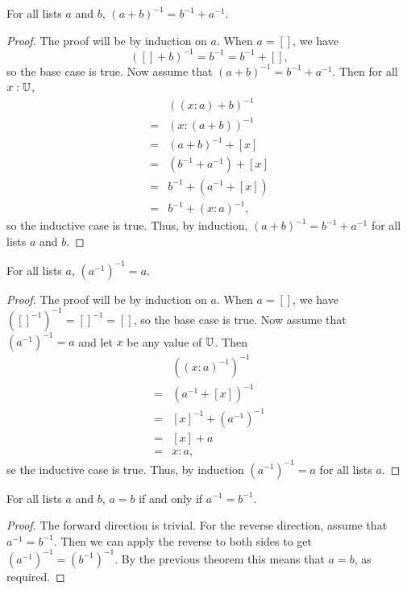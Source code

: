 \documentclass[../../math.tex]{subfiles}
\begin{document}
\begin{theorem}
    For all lists $a$ and $b$, $(a + b)^{-1} = b^{-1} + a^{-1}$.
\end{theorem}
\begin{proof}
    The proof will be by induction on $a$.  When $a = []$, we have
    \[
        ([] + b)^{-1} = b^{-1} = b^{-1} + [],
    \]
    so the base case is true.  Now assume that $(a + b)^{-1} = b^{-1} +
    a^{-1}$.  Then for all $x : \mathbb{U}$,
    \begin{align*}
           & ((x : a) + b)^{-1} \\
        ={}& (x : (a + b))^{-1} \\
        ={}& (a + b)^{-1} + [x] \\
        ={}& (b^{-1} + a^{-1}) + [x] \\
        ={}& b^{-1} + (a^{-1} + [x]) \\
        ={}& b^{-1} + (x : a)^{-1},
    \end{align*}
    so the inductive case is true.  Thus, by induction, $(a + b)^{-1} =
    b^{-1} + a^{-1}$ for all lists $a$ and $b$.
\end{proof}

\begin{theorem} \label{list_reverse_reverse}
    For all lists $a$, $(a^{-1})^{-1} = a$.
\end{theorem}
\begin{proof}
    The proof will be by induction on $a$.  When $a = []$, we have
    $([]^{-1})^{-1} = []^{-1} = []$, so the base case is true.  Now assume that
    $(a^{-1})^{-1} = a$ and let $x$ be any value of $\mathbb{U}$.  Then
    \begin{align*}
           & ((x : a)^{-1})^{-1} \\
        ={}& (a^{-1} + [x])^{-1} \\
        ={}& [x]^{-1} + (a^{-1})^{-1} \\
        ={}& [x] + a \\
        ={}& x : a,
    \end{align*}
    se the inductive case is true.  Thus, by induction $(a^{-1})^{-1} = a$ for
    all lists $a$.
\end{proof}

\begin{theorem}
    For all lists $a$ and $b$, $a = b$ if and only if $a^{-1} = b^{-1}$.
\end{theorem}
\begin{proof}
    The forward direction is trivial.  For the reverse direction, assume that
    $a^{-1} = b^{-1}$.  Then we can apply the reverse to both sides to get
    $(a^{-1})^{-1} = (b^{-1})^{-1}$.  By the previous theorem this means that $a
    = b$, as required.
\end{proof}
\end{document}
